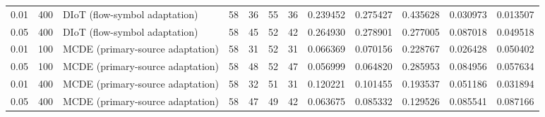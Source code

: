 \begin{tabular}{llllllllllll}
0.01 & 400 & DIoT (flow-symbol adaptation) & 58 & 36 & 55 & 36 & 0.239452 & 0.275427 & 0.435628 & 0.030973 & 0.013507 \\
0.05 & 400 & DIoT (flow-symbol adaptation) & 58 & 45 & 52 & 42 & 0.264930 & 0.278901 & 0.277005 & 0.087018 & 0.049518 \\
0.01 & 100 & MCDE (primary-source adaptation) & 58 & 31 & 52 & 31 & 0.066369 & 0.070156 & 0.228767 & 0.026428 & 0.050402 \\
0.05 & 100 & MCDE (primary-source adaptation) & 58 & 48 & 52 & 47 & 0.056999 & 0.064820 & 0.285953 & 0.084956 & 0.057634 \\
0.01 & 400 & MCDE (primary-source adaptation) & 58 & 32 & 51 & 31 & 0.120221 & 0.101455 & 0.193537 & 0.051186 & 0.031894 \\
0.05 & 400 & MCDE (primary-source adaptation) & 58 & 47 & 49 & 42 & 0.063675 & 0.085332 & 0.129526 & 0.085541 & 0.087166 \\
\bottomrule
\end{tabular}
